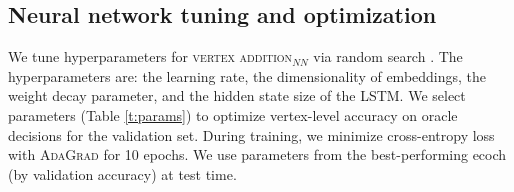 \subsection{Neural network tuning and optimization}
We tune hyperparameters for \textsc{vertex addition}$_{NN}$ via random search \cite{Bergstra2012RandomSF}. The hyperparameters are: the learning rate, the dimensionality of embeddings, the weight decay parameter, and the hidden state size of the LSTM. We select parameters (Table \ref{t:params}) to optimize vertex-level accuracy on oracle decisions for the validation set. During training, we minimize cross-entropy loss with \textsc{AdaGrad} \cite{duchi2011adaptive} for 10 epochs. We use parameters from the best-performing ecoch (by validation accuracy) at test time.

\begin{table}[htb!]
\centering
{}
\caption{Hyperparameters for \textsc{vertex addition}$_{NN}$}\label{t:params}
\end{table}



